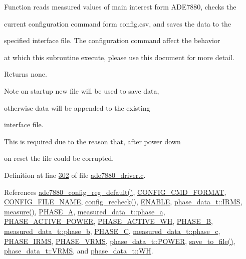  

Function reads measured values of main interest form A\-D\-E7880, checks the \par
 current configuration command form config.\-csv, and saves the data to the \par
 specified interface file. The configuration command affect the behavior \par
 at which this subroutine execute, please use this document for more detail.

\begin{DoxyReturn}{Returns}
none. 

 
\end{DoxyReturn}
\begin{DoxyNote}{Note}
on startup new file will be used to save data, \par
 otherwise data will be appended to the existing \par
 interface file. \par
 This is required due to the reason that, after power down \par
 on reset the file could be corrupted.
\end{DoxyNote}


Definition at line \hyperlink{a00035_source_l00302}{302} of file \hyperlink{a00035_source}{ade7880\-\_\-driver.\-c}.



References \hyperlink{a00005_ga7782772c18e6ea515dcd28dcaedd0f06}{ade7880\-\_\-config\-\_\-reg\-\_\-default()}, \hyperlink{a00037_source_l00115}{C\-O\-N\-F\-I\-G\-\_\-\-C\-M\-D\-\_\-\-F\-O\-R\-M\-A\-T}, \hyperlink{a00037_source_l00114}{C\-O\-N\-F\-I\-G\-\_\-\-F\-I\-L\-E\-\_\-\-N\-A\-M\-E}, \hyperlink{a00035_source_l00482}{config\-\_\-recheck()}, \hyperlink{a00037_source_l00040}{E\-N\-A\-B\-L\-E}, \hyperlink{a00037_source_l00017}{phase\-\_\-data\-\_\-t\-::\-I\-R\-M\-S}, \hyperlink{a00042_source_l00040}{measure()}, \hyperlink{a00043_source_l00021}{P\-H\-A\-S\-E\-\_\-\-A}, \hyperlink{a00037_source_l00028}{measured\-\_\-data\-\_\-t\-::phase\-\_\-a}, \hyperlink{a00043_source_l00030}{P\-H\-A\-S\-E\-\_\-\-A\-C\-T\-I\-V\-E\-\_\-\-P\-O\-W\-E\-R}, \hyperlink{a00043_source_l00028}{P\-H\-A\-S\-E\-\_\-\-A\-C\-T\-I\-V\-E\-\_\-\-W\-H}, \hyperlink{a00043_source_l00022}{P\-H\-A\-S\-E\-\_\-\-B}, \hyperlink{a00037_source_l00029}{measured\-\_\-data\-\_\-t\-::phase\-\_\-b}, \hyperlink{a00043_source_l00023}{P\-H\-A\-S\-E\-\_\-\-C}, \hyperlink{a00037_source_l00030}{measured\-\_\-data\-\_\-t\-::phase\-\_\-c}, \hyperlink{a00043_source_l00027}{P\-H\-A\-S\-E\-\_\-\-I\-R\-M\-S}, \hyperlink{a00043_source_l00026}{P\-H\-A\-S\-E\-\_\-\-V\-R\-M\-S}, \hyperlink{a00037_source_l00020}{phase\-\_\-data\-\_\-t\-::\-P\-O\-W\-E\-R}, \hyperlink{a00035_source_l00421}{save\-\_\-to\-\_\-file()}, \hyperlink{a00037_source_l00018}{phase\-\_\-data\-\_\-t\-::\-V\-R\-M\-S}, and \hyperlink{a00037_source_l00019}{phase\-\_\-data\-\_\-t\-::\-W\-H}.



